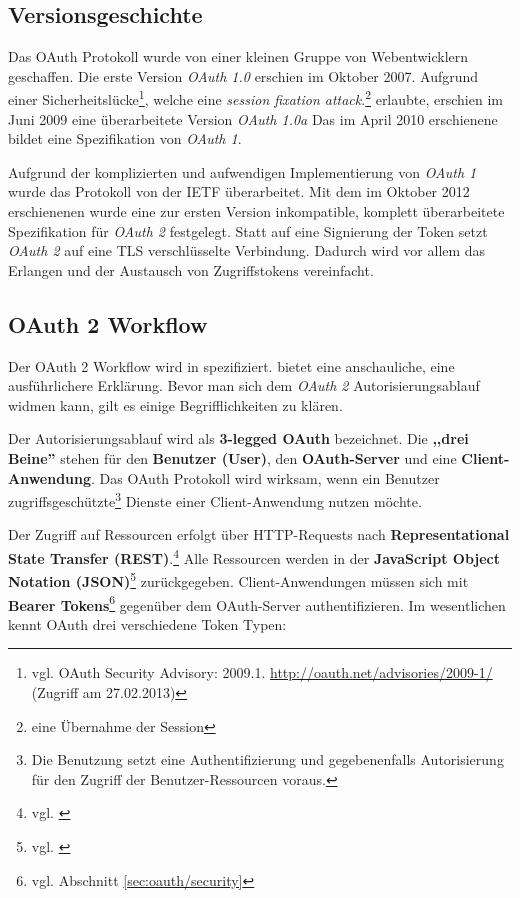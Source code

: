 \documentclass[12pt,a4paper,pointednumbers,abstracton]{scrartcl}
\begin{document}
\subsection{Versionsgeschichte}

Das OAuth Protokoll wurde von einer kleinen Gruppe von Webentwicklern geschaffen.
Die erste Version \emph{OAuth 1.0} erschien im Oktober 2007.
Aufgrund einer Sicherheitslücke\footnote{vgl. OAuth Security Advisory: 2009.1. \url{http://oauth.net/advisories/2009-1/} (Zugriff am 27.02.2013)}, welche eine \emph{session fixation attack}.\footnote{eine Übernahme der Session} erlaubte, erschien im Juni 2009 eine überarbeitete Version \emph{OAuth 1.0a}
Das im April 2010 erschienene \cite{RFC5849} bildet eine Spezifikation von \emph{OAuth 1}.

Aufgrund der komplizierten und aufwendigen Implementierung von \emph{OAuth 1} wurde das Protokoll von der IETF überarbeitet.
Mit dem im Oktober 2012 erschienenen \cite{RFC5849} wurde eine zur ersten Version inkompatible, komplett überarbeitete Spezifikation für \emph{OAuth 2} festgelegt. Statt auf eine Signierung der Token setzt \emph{OAuth 2} auf eine TLS verschlüsselte Verbindung.
Dadurch wird vor allem das Erlangen und der Austausch von Zugriffstokens vereinfacht.

\subsection{OAuth 2 Workflow}
\label{sec:oauth2_workflow}

Der OAuth 2 Workflow wird in \cite{RFC5849} spezifiziert.
\cite[Chapter 9]{Leb11} bietet eine anschauliche, \cite{Boy12} eine ausführlichere Erklärung.
Bevor man sich dem \emph{OAuth 2} Autorisierungsablauf widmen kann, gilt es einige Begrifflichkeiten zu klären.

Der Autorisierungsablauf wird als \textbf{3-legged OAuth} bezeichnet.
Die \textbf{,,drei Beine''} stehen für den \textbf{Benutzer (User)}, den \textbf{OAuth-Server} und eine \textbf{Client-Anwendung}.
Das OAuth Protokoll wird wirksam, wenn ein Benutzer zugriffsgeschützte\footnote{Die Benutzung setzt eine Authentifizierung und gegebenenfalls Autorisierung für den Zugriff der Benutzer-Ressourcen voraus.} Dienste einer Client-Anwendung nutzen möchte.

Der Zugriff auf Ressourcen erfolgt über HTTP-Requests nach \textbf{Representational State Transfer (REST)}.\footnote{vgl. \cite[Chapter 5]{Fie00}}
Alle Ressourcen werden in der \textbf{JavaScript Object Notation (JSON)}\footnote{vgl. \cite{Cro06}} zurückgegeben.
Client-Anwendungen müssen sich mit \textbf{Bearer Tokens}\footnote{vgl. Abschnitt \ref{sec:oauth/security}} gegenüber dem OAuth-Server authentifizieren.
Im wesentlichen kennt OAuth drei verschiedene Token Typen:
\end{document}
